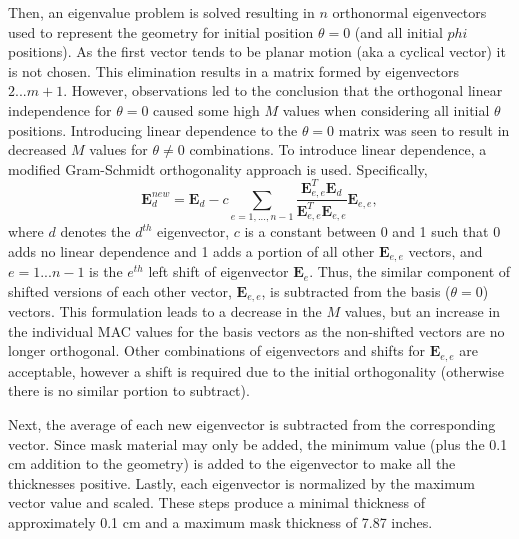 \documentclass[3p,times]{elsarticle}
\begin{document}
Then, an eigenvalue problem is solved resulting in $n$ orthonormal eigenvectors used to represent the geometry for initial position $\theta=0$ (and all initial $phi$ positions).  
As the first vector tends to be planar motion (aka a cyclical vector) it is not chosen.  This elimination results in a matrix formed 
by eigenvectors $2...m+1$.  However, observations led to the conclusion that the orthogonal linear independence for $\theta=0$ caused some high $M$ values when 
considering all initial $\theta$ positions.  Introducing 
linear dependence to the $\theta=0$ matrix was seen to result in decreased $M$ values for $\theta\neq 0$ combinations.  To introduce linear dependence, a modified Gram-Schmidt orthogonality approach is used.  Specifically, 
\begin{equation}
\mathbf{E}^{new}_{d}=\mathbf{E}_{d}- c \sum_{e=1,...,n-1} \frac{\mathbf{E}_{e,e}^T \mathbf{E}_{d}}{\mathbf{E}_{e,e}^T \mathbf{E}_{e,e}}\mathbf{E}_{e,e},
\label{eq:GS}
\end{equation}
where $d$ denotes the $d^{th}$ eigenvector, $c$ is a constant between 0 and 1 such that 0 adds no linear dependence and 1 adds a portion of all other $\mathbf{E}_{e,e}$ vectors, 
and $e=1...n-1$ is the $e^{th}$ left shift of eigenvector $\mathbf{E}_e$. Thus, the similar component of shifted versions of each other vector, $\mathbf{E}_{e,e}$, is subtracted from
the basis ($\theta=0$) vectors. This formulation leads
to a decrease in the $M$ values, but an increase in the individual MAC values for the basis vectors as the non-shifted vectors are no longer orthogonal.
Other combinations of eigenvectors and shifts for $\mathbf{E}_{e,e}$ are acceptable, however a shift is required due to the initial orthogonality (otherwise there is no similar portion to subtract).

Next, the average of each new eigenvector is subtracted from the corresponding vector.  Since mask material may only be added, the minimum value (plus the 0.1 cm addition to the geometry) 
is added to the eigenvector to make all the thicknesses positive.  Lastly, each eigenvector is normalized by the maximum vector value and scaled.  
These steps produce a minimal thickness of approximately 0.1 cm and a maximum mask thickness of 7.87 inches.
\end{document}
